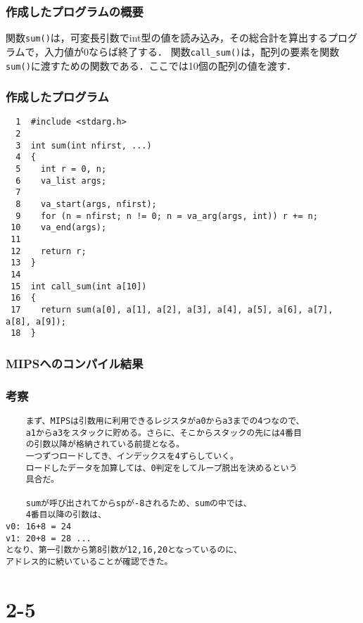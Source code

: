 \documentclass[a4j,11pt]{jarticle}
\begin{document}
  \subsubsection{作成したプログラムの概要}
  関数\verb|sum()|は，可変長引数でint型の値を読み込み，その総合計を算出するプログラムで，入力値が0ならば終了する．
  関数\verb|call_sum()|は，配列の要素を関数\verb|sum()|に渡すための関数である．ここでは10個の配列の値を渡す．
  \subsubsection{作成したプログラム}
  \begin{verbatim}
  1  #include <stdarg.h>
  2
  3  int sum(int nfirst, ...)
  4  {
  5    int r = 0, n;
  6    va_list args;
  7
  8    va_start(args, nfirst);
  9    for (n = nfirst; n != 0; n = va_arg(args, int)) r += n;
 10    va_end(args);
 11
 12    return r;
 13  }
 14
 15  int call_sum(int a[10])
 16  {
 17    return sum(a[0], a[1], a[2], a[3], a[4], a[5], a[6], a[7], a[8], a[9]);
 18  }
  \end{verbatim}
  \subsubsection{MIPSへのコンパイル結果}
  \subsubsection{考察}
  \begin{verbatim}
    まず、MIPSは引数用に利用できるレジスタがa0からa3までの4つなので、
    a1からa3をスタックに貯める。さらに、そこからスタックの先には4番目
    の引数以降が格納されている前提となる。 
    一つずつロードしてき、インデックスを4ずらしていく。
    ロードしたデータを加算しては、0判定をしてループ脱出を決めるという
    具合だ。

    sumが呼び出されてからspが-8されるため、sumの中では、
    4番目以降の引数は、
v0: 16+8 = 24
v1: 20+8 = 28 ...
となり、第一引数から第8引数が12,16,20となっているのに、
アドレス的に続いていることが確認できた。
  \end{verbatim}

 \section{2-5}

\end{document}
